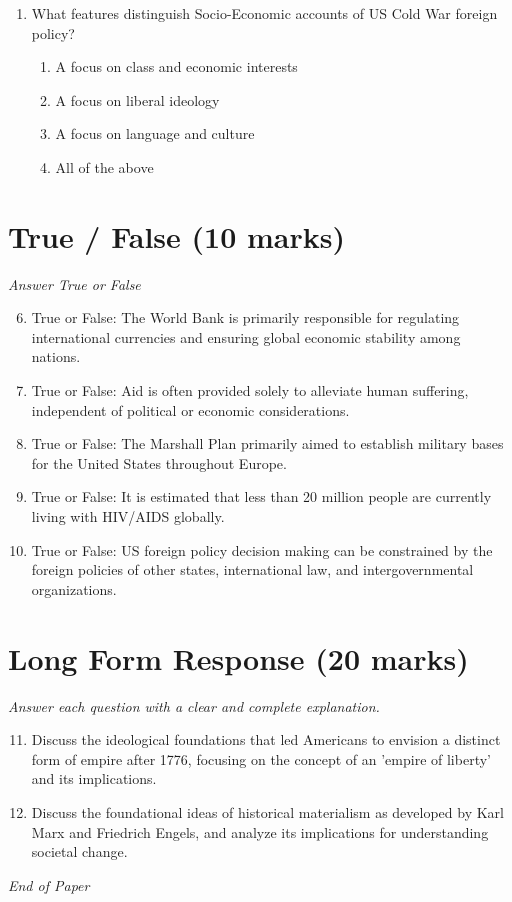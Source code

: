 \documentclass[12pt]{article}
\begin{document}
\begin{enumerate}[label=\arabic*.]
\begin{enumerate}[label=(\alph*)]
    \item Alliances, diplomacy and protectionism
    \item The balance of power, self-sufficiency and prudence
    \item None of the above
\end{enumerate}
\item What features distinguish Socio-Economic accounts of US Cold War foreign policy?
\begin{enumerate}[label=(\alph*)]
    \item A focus on class and economic interests
    \item A focus on liberal ideology
    \item A focus on language and culture
    \item All of the above
\end{enumerate}
\end{enumerate}

\section*{True / False (10 marks)}
\textit{Answer True or False}
\begin{enumerate}[label=\arabic*.]
\setcounter{enumi}{5}
\item True or False: The World Bank is primarily responsible for regulating international currencies and ensuring global economic stability among nations.
\item True or False: Aid is often provided solely to alleviate human suffering, independent of political or economic considerations.
\item True or False: The Marshall Plan primarily aimed to establish military bases for the United States throughout Europe.
\item True or False: It is estimated that less than 20 million people are currently living with HIV/AIDS globally.
\item True or False: US foreign policy decision making can be constrained by the foreign policies of other states, international law, and intergovernmental organizations.
\end{enumerate}

\section*{Long Form Response (20 marks)}
\textit{Answer each question with a clear and complete explanation.}
\begin{enumerate}[label=\arabic*.]
\setcounter{enumi}{10}
\item Discuss the ideological foundations that led Americans to envision a distinct form of empire after 1776, focusing on the concept of an 'empire of liberty' and its implications.
\item Discuss the foundational ideas of historical materialism as developed by Karl Marx and Friedrich Engels, and analyze its implications for understanding societal change.
\end{enumerate}

\vfill
\noindent\textit{End of Paper}
\end{document}
